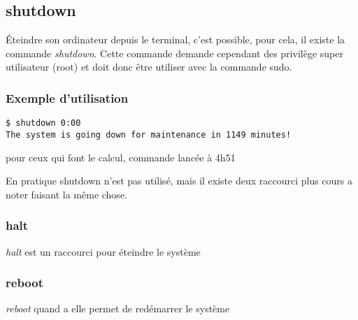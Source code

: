\subsection*{shutdown}
Éteindre son ordinateur depuis le terminal, c'est possible,  pour cela, il existe la commande \emph{shutdown}.
Cette commande demande cependant des privilège super utilisateur (root) et doit donc être utiliser avec la commande sudo.
\subsubsection*{Exemple d'utilisation}

\begin{lstlisting}
$ shutdown 0:00
The system is going down for maintenance in 1149 minutes!
\end{lstlisting}
\begin{tiny}
pour ceux qui font le calcul, commande lancée à 4h51\\
\end{tiny}

En pratique shutdown n'est pas utilisé, mais il existe deux raccourci plus cours a noter faisant la même chose.

\subsubsection*{halt}
\emph{halt} est un raccourci pour éteindre le système

\subsubsection*{reboot}
\emph{reboot} quand a elle permet de redémarrer le système
